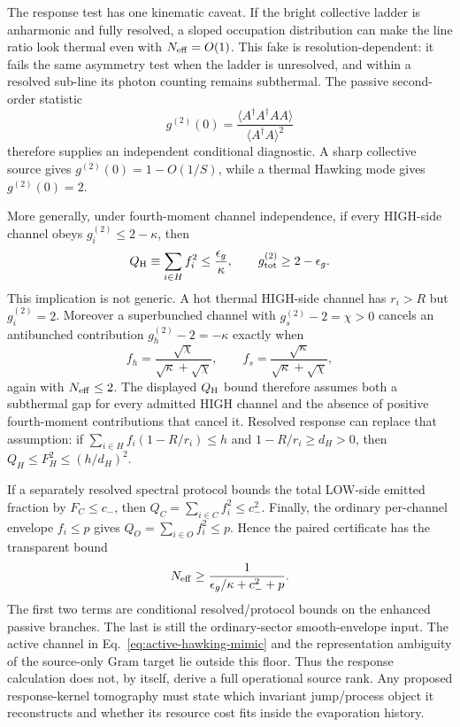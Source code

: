 \documentclass[12pt]{article}
\newcommand{\be}{\begin{equation}}
\newcommand{\ee}{\end{equation}}
\newcommand{\Neff}{N_{\rm eff}}
\begin{document}
The response test has one kinematic caveat.  If the bright collective
ladder is anharmonic and fully resolved, a sloped occupation
distribution can make the line ratio look thermal even with
$\Neff=O(1)$.  This fake is resolution-dependent: it fails the same
asymmetry test when the ladder is unresolved, and within a resolved
sub-line its photon counting remains subthermal.  The passive
second-order statistic
\be
  g^{(2)}(0)
  =
  \frac{\langle A^\dagger A^\dagger A A\rangle}
       {\langle A^\dagger A\rangle^2}
\ee
therefore supplies an independent conditional diagnostic.  A sharp
collective source gives $g^{(2)}(0)=1-O(1/S)$, while a thermal Hawking
mode gives $g^{(2)}(0)=2$.

More generally, under fourth-moment channel independence, if every
HIGH-side channel obeys $g_i^{(2)}\leq2-\kappa$, then
\be
  Q_{\rm H}\equiv\sum_{i\in H}f_i^2
  \leq \frac{\epsilon_g}{\kappa},
  \qquad
  g_{\rm tot}^{(2)}\geq2-\epsilon_g.
\ee
This implication is not generic.  A hot thermal HIGH-side channel has
$r_i>R$ but $g_i^{(2)}=2$.  Moreover a superbunched channel with
$g_s^{(2)}-2=\chi>0$ cancels an antibunched contribution
$g_h^{(2)}-2=-\kappa$ exactly when
\be
 f_h=\frac{\sqrt\chi}{\sqrt\kappa+\sqrt\chi},\qquad
 f_s=\frac{\sqrt\kappa}{\sqrt\kappa+\sqrt\chi},
\ee
again with $\Neff\leq2$.  The displayed $Q_{\rm H}$ bound therefore assumes
both a subthermal gap for every admitted HIGH channel and the absence of
positive fourth-moment contributions that cancel it.  Resolved response can
replace that assumption: if
$\sum_{i\in H}f_i(1-R/r_i)\leq h$ and
$1-R/r_i\geq d_H>0$, then
$Q_H\leq F_H^2\leq(h/d_H)^2$.

If a separately resolved spectral protocol bounds the total LOW-side
emitted fraction by $F_C\leq c_-$, then
$Q_C=\sum_{i\in C}f_i^2\leq c_-^2$.  Finally, the ordinary per-channel
envelope $f_i\leq p$ gives
$Q_O=\sum_{i\in O}f_i^2\leq p$.  Hence the paired certificate has the
transparent bound
\be
  \Neff
  \geq
  \frac{1}{\epsilon_g/\kappa+c_-^2+p}.
\label{eq:paired-floor}
\ee
The first two terms are conditional resolved/protocol bounds on the enhanced
passive branches.  The last is still the ordinary-sector smooth-envelope
input.  The active channel in Eq.~\eqref{eq:active-hawking-mimic} and the
representation ambiguity of the source-only Gram target lie outside this
floor.  Thus the response calculation does not, by itself, derive a full
operational source rank.  Any proposed response-kernel tomography must state
which invariant jump/process object it reconstructs and whether its resource
cost fits inside the evaporation history.
\end{document}
